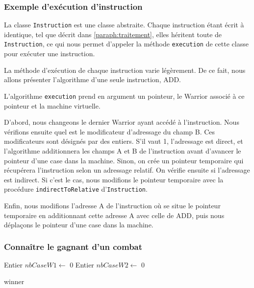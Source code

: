 \documentclass[hidelinks]{report}
\begin{document}
\subsubsection{Exemple d'exécution d'instruction\label{subsubsec:instruction}}
La classe \texttt{Instruction} est une classe abstraite. Chaque instruction étant écrit à identique, tel que décrit dans \autoref{paraph:traitement}, elles héritent toute de \texttt{Instruction}, ce qui nous permet d'appeler la méthode \texttt{execution} de cette classe pour exécuter une instruction.

La méthode d'exécution de chaque instruction varie légèrement. De ce fait, nous allons présenter l'algorithme d'une seule instruction, ADD.

L'algorithme \texttt{execution} prend en argument un pointeur, le Warrior associé à ce pointeur et la machine virtuelle.

D'abord, nous changeons le dernier Warrior ayant accédé à l'instruction. Nous vérifions ensuite quel est le modificateur d'adressage du champ B. Ces modificateurs sont désignés par des entiers. S'il vaut 1, l'adressage est direct, et l'algorithme additionnera les champs A et B de l'instruction avant d'avancer le pointeur d'une case dans la machine. Sinon, on crée un pointeur temporaire qui récupérera l'instruction selon un adressage relatif. On vérifie ensuite si l'adressage est indirect. Si c'est le cas, nous modifions le pointeur temporaire avec la procédure \texttt{indirectToRelative} d'\texttt{Instruction}.

Enfin, nous modifions l'adresse A de l'instruction où se situe le pointeur temporaire en additionnant cette adresse A avec celle de ADD, puis nous déplaçons le pointeur d'une case dans la machine.

\subsubsection{Connaître le gagnant d'un combat}

\begin{algorithm}
\DontPrintSemicolon
{}
Entier $nbCaseW1 \gets$ 0\;
Entier $nbCaseW2 \gets$ 0\;
\caption{\sc winner}
\label{algo:winner}
\end{algorithm}
\end{document}
